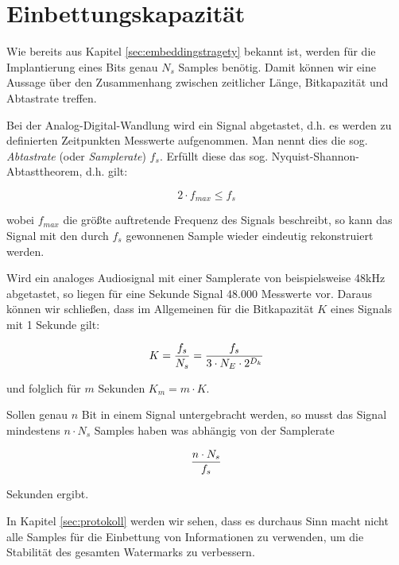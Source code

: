 \section{Einbettungskapazit\"at}
\label{sec:embedding-capacity}

Wie bereits aus Kapitel \ref{sec:embeddingstragety} bekannt ist, werden für die Implantierung eines Bits genau $N_s$ Samples benötig. Damit können wir eine Aussage über den Zusammenhang zwischen zeitlicher Länge, Bitkapazität und Abtastrate treffen. 

Bei der Analog-Digital-Wandlung wird ein Signal abgetastet, d.h. es werden zu definierten Zeitpunkten Messwerte aufgenommen. Man nennt dies die sog. \textit{Abtastrate} (oder \textit{Samplerate}) $f_s$. Erfüllt diese das sog. Nyquist-Shannon-Abtasttheorem\cite{shannon1949communication}, d.h. gilt: 

	 \begin{equation}
		 2 \cdot f_{max} \leq f_s
	 	\label{equ:abtasttheorem}
	 \end{equation}
	
wobei ${f}_{max}$ die größte auftretende Frequenz des Signals beschreibt, so kann das Signal mit den durch $f_s$ gewonnenen Sample wieder eindeutig rekonstruiert werden.

Wird ein analoges Audiosignal mit einer Samplerate von beispielsweise 48kHz abgetastet, so liegen für eine Sekunde Signal 48.000 Messwerte vor. Daraus können wir schließen, dass im Allgemeinen für die Bitkapazität $K$ eines Signals mit 1 Sekunde gilt: 

	 \begin{equation}
		 K = { {f}_{s} \over N_s } = { {f}_{s} \over 3 \cdot {N}_{E} \cdot 2 ^ {{D}_{k}} }
	 	\label{equ:bitcapacity_1sec}
	 \end{equation}

und folglich für $m$ Sekunden ${K}_{m} = m \cdot K$. 

Sollen genau $n$ Bit in einem Signal untergebracht werden, so musst das Signal mindestens $n \cdot {N}_{s}$ Samples haben was abhängig von der Samplerate

	 \begin{equation}
		 { n \cdot {N}_{s} \over {f}_{s} }
	 	\label{equ:bitcapacity_seconds}
	 \end{equation}
	 
Sekunden ergibt. 

In Kapitel \ref{sec:protokoll} werden wir sehen, dass es durchaus Sinn macht nicht alle Samples für die Einbettung von Informationen zu verwenden, um die Stabilität des gesamten Watermarks zu verbessern. 






